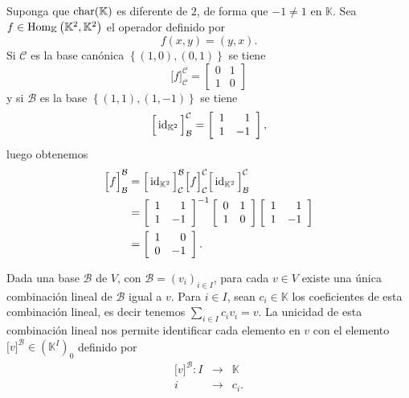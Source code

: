 \begin{ejem}
Suponga que $\operatorname{char}(\mathbb{K})$ es diferente de $2$, de forma que $-1\ne 1$ en $\mathbb{K}$. Sea $f\in\operatorname{Hom}_{\mathbb{K}}\left(\mathbb{K}^2,\mathbb{K}^2\right)$ el operador definido por
$$f(x,y)=(y,x).$$
Si $\mathcal{C}$ es la base  can\'onica $\left\{(1,0),(0,1)\right\}$ se tiene
$$\Big[ f\Big]^{\mathcal{C}}_{\mathcal{C}}=
\left[\begin{array}{rr}
0 & 1\\ 1 & 0
\end{array}\right]
$$
y si $\mathcal{B}$ es la base $\left\{(1,1),(1,-1)\right\}$ se tiene
$$\Big[ \operatorname{id}_{\mathbb{K}^2}\Big]^{\mathcal{C}}_{\mathcal{B}}=
\left[\begin{array}{rr}
1 & 1\\ 1 & -1
\end{array}\right],
$$
luego obtenemos
\begin{align*}
\Big[ f\Big]^{\mathcal{B}}_{\mathcal{B}} &= \Big[ \operatorname{id}_{\mathbb{K}^2}\Big]^{\mathcal{B}}_{\mathcal{C}}\Big[ f\Big]^{\mathcal{C}}_{\mathcal{C}}\Big[ \operatorname{id}_{\mathbb{K}^2}\Big]^{\mathcal{C}}_{\mathcal{B}}\\
 &=\left[\begin{array}{rr}
1 & 1\\ 1 & -1
\end{array}\right]^{-1}
\left[\begin{array}{rr}
0 & 1\\ 1 & 0
\end{array}\right]
\left[\begin{array}{rr}
1 & 1\\ 1 & -1
\end{array}\right]\\
 &= \left[\begin{array}{rr}
1 & 0\\ 0 & -1
\end{array}\right].
\end{align*}
\end{ejem}

\begin{obs}\label{defnvectcoorinfty}
Dada una base $\mathcal{B}$ de $V$, con $\mathcal{B}=(v_i)_{i\in I}$, para cada $v\in V$ existe una \'unica combinaci\'on lineal de $\mathcal{B}$ igual a $v$. Para $i\in I$, sean $c_i\in \mathbb{K}$ los coeficientes de esta combinaci\'on lineal, es decir tenemos $\sum_{i\in I} c_iv_i=v$.
La unicidad de esta combinaci\'on lineal nos permite identificar cada elemento en $v$ con el elemento $\Big[v\Big]^\mathcal{B}\in\left(\mathbb{K}^I\right)_0$ definido por
\begin{eqnarray*}
\Big[v\Big]^\mathcal{B}: I & \longrightarrow & \mathbb{K}\\
i & \longrightarrow & c_i.
\end{eqnarray*}
\end{obs}

